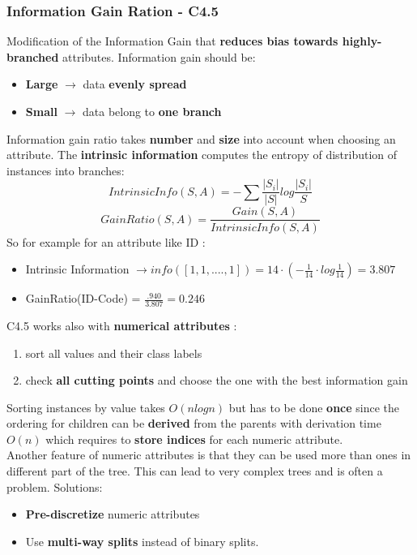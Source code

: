 \subsubsection{Information Gain Ration - C4.5}
Modification of the Information Gain that \textbf{reduces bias towards highly-branched} attributes. Information gain should be:
\begin{itemize}
\item \textbf{Large} $\rightarrow$ data \textbf{evenly spread}
\item \textbf{Small} $\rightarrow$ data belong to \textbf{one branch}
\end{itemize}  
Information gain ratio takes \textbf{number} and \textbf{size} into account when choosing an attribute. The \textbf{intrinsic information } computes the entropy of distribution of instances into branches:
$$ IntrinsicInfo(S,A) = - \sum \frac{|S_i|}{|S|}log \frac{|S_i|}{S}$$
$$ GainRatio(S,A) =  \frac{Gain(S,A)}{IntrinsicInfo(S,A)}$$
So for example for an attribute like ID :
\begin{itemize}
\item Intrinsic Information $\rightarrow info([1,1,....,1])=14 \cdot (-\frac{1}{14} \cdot log \frac{1}{14})= 3.807 $
\item GainRatio(ID-Code) = $\frac{.940}{3.807}= 0.246$
\end{itemize}
C4.5 works also with \textbf{numerical attributes} :
\begin{enumerate}
\item sort all values and their class labels 
\item check \textbf{all cutting points} and choose the one with the best information gain
\end{enumerate}
Sorting instances by value takes $O(nlogn)$  but has to be done \textbf{once} since the ordering for children can be \textbf{derived} from the parents with derivation time $O(n)$ which requires to \textbf{store indices} for each numeric attribute.\\
Another feature of numeric attributes is that they can be used more than ones in different part of the tree. This can lead to very complex trees and is often a problem. Solutions:
\begin{itemize}
\item \textbf{Pre-discretize} numeric attributes
\item Use \textbf{multi-way splits} instead of binary splits.
\end{itemize}

